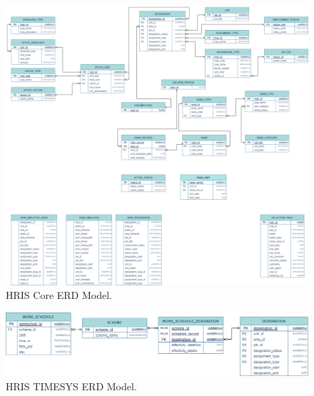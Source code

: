     \begin{figure}[H]
        \centering
        \includegraphics[width=1\linewidth]{figures/fig-erd-hris.png}
        \caption{HRIS Core ERD Model.}
        \label{fig:enter-label}
    \end{figure}

    \begin{figure}[H]
        \centering
        \includegraphics[width=1\linewidth]{figures/fig-erd-timesys.png}
        \caption{HRIS TIMESYS ERD Model.}
        \label{fig:enter-label}
    \end{figure}

